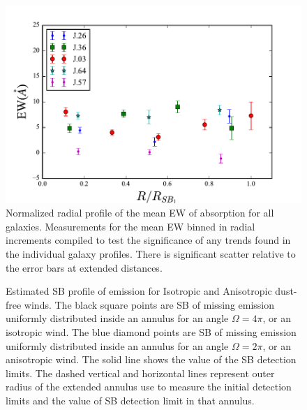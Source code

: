 \documentclass[twocolumn]{aastex61}
\begin{document}
\begin{figure}[!htb]
\centering
\includegraphics[scale=0.9]{../Figures/ew_comb.pdf}
\caption{Normalized radial profile of the mean EW of  absorption for all galaxies. Measurements for the mean EW binned in radial increments compiled to test the significance of any trends found in the individual galaxy profiles. There is significant scatter relative to the error bars at extended distances.}
\label{fig:ew_comb}
\end{figure}

\begin{figure}[h]
\centering
{}
\caption{Estimated SB profile of  emission for Isotropic and Anisotropic dust-free winds. The black square points are SB of missing  emission uniformly distributed inside an annulus for an angle $\Omega=4\pi$, or an isotropic wind. The blue diamond points are SB of missing  emission uniformly distributed inside an annulus for an angle $\Omega=2\pi$, or an anisotropic wind. The solid line shows the value of the SB detection limits. The dashed vertical and horizontal lines represent outer radius of the extended annulus use to measure the initial detection limits and the value of SB detection limit in that annulus.}
\label{fig.emission}
\end{figure}

\newpage

\end{document}
